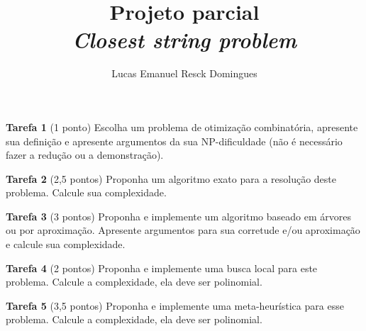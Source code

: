 \documentclass{article}
\title{Projeto parcial \\
\large \textit{Closest string problem}}
\author{Lucas Emanuel Resck Domingues}
\begin{document}
    \maketitle
    
    \noindent \textbf{Tarefa 1} (1 ponto) Escolha um problema de otimização combinatória, apresente sua definição e apresente argumentos da sua NP-dificuldade (não é necessário fazer a redução ou a demonstração).

    \bigskip

    

    \newpage
    
    \noindent \textbf{Tarefa 2} (2,5 pontos) Proponha um algoritmo exato para a resolução deste     problema. Calcule sua complexidade.

    \bigskip

    

    \newpage
    
    \noindent \textbf{Tarefa 3} (3 pontos) Proponha e implemente um algoritmo baseado em árvores
    ou por aproximação. Apresente argumentos para sua corretude e/ou aproximação e calcule sua complexidade.

    \bigskip

    

    \newpage
    
    \noindent \textbf{Tarefa 4} (2 pontos) Proponha e implemente uma busca local para este problema. Calcule a complexidade, ela deve ser polinomial.

    \bigskip

    

    \newpage
    
    \noindent \textbf{Tarefa 5} (3,5 pontos) Proponha e implemente uma meta-heurística para esse
    problema. Calcule a complexidade, ela deve ser polinomial.

    \bigskip

    

    \newpage

    
    
\end{document}
